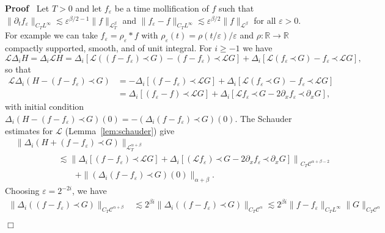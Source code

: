 \documentclass[a4paper,11pt]{article}
\newcommand{\upl}{+}
\newenvironment{proof}{\noindent\textbf{Proof\ }}{\hspace*{\fill}$\Box$\medskip}
\newcommand{\LL}{\mathscr{L}}
\newcommand{\CC}{\mathscr{C}}
\newcommand{\lpara}{\,\mathord{\prec}\,}
\begin{document}
\begin{proof}
  Let $T > 0$ and let $f_{\varepsilon}$ be a time mollification of $f$ such
  that $\| \partial_t f_{\varepsilon} \|_{C_T L^{\infty}} \lesssim
  \varepsilon^{\beta / 2 - 1} \| f \|_{\LL^{\beta}_T}$ and $\| f_{\varepsilon}
  - f \|_{C_T L^{\infty}} \lesssim \varepsilon^{\beta / 2} \| f
  \|_{\LL^{\beta}}$ for all $\varepsilon > 0$. For example we can take
  $f_{\varepsilon} = \rho_{\varepsilon} \ast f$ with $\rho_{\varepsilon} (t) =
  \rho (t / \varepsilon) / \varepsilon$ and $\rho : \mathbb{R} \rightarrow
  \mathbb{R}$ compactly supported, smooth, and of unit integral. For $i
  \geqslant - 1$ we have
  \[ \LL \Delta_i H = \Delta_i  \LL H = \Delta_i \left[ \LL ((f - f_{\varepsilon}) \lpara G) - (f
     - f_{\varepsilon}) \lpara \LL G \right] + \Delta_i \left[ \LL
     (f_{\varepsilon} \lpara G) - f_{\varepsilon} \lpara \LL G \right], \]
  so that
  \begin{align*}
      \LL \Delta_i (H - (f - f_{\varepsilon}) \lpara G) & = - \Delta_i \left[ (f - f_{\varepsilon}) \lpara \LL G \right] + \Delta_i \left[ \LL(f_{\varepsilon} \lpara G) - f_{\varepsilon} \lpara \LL G \right] \\
      & = \Delta_i \left[ (f_{\varepsilon} - f) \lpara \LL G \right] + \Delta_i \left[ \LL f_{\varepsilon} \lpara G - 2 \partial_x f_{\varepsilon} \lpara \partial_x G \right],
  \end{align*}
  with initial condition $\Delta_i (H - (f - f_{\varepsilon}) \lpara G) (0) = -
  (\Delta_i (f - f_{\varepsilon}) \lpara G) (0)$. The Schauder estimates for
  $\LL$ (Lemma~\ref{lem:schauder}) give
  \begin{align*}
      &\| \Delta_i (H + (f - f_{\varepsilon}) \lpara G) \|_{\LL^{\alpha \upl \beta}_T} \\
      &\hspace{60pt} \lesssim \left\| \Delta_i \left[ (f - f_{\varepsilon}) \lpara \LL G \right] + \Delta_i \left[ \left( \LL f_{\varepsilon} \right) \lpara G - 2 \partial_x f_{\varepsilon} \lpara \partial_x G \right] \right\|_{C_T \CC^{\alpha + \beta - 2}} \\
      &\hspace{60pt} \qquad + \| (\Delta_i (f - f_{\varepsilon}) \lpara G) (0) \|_{\alpha + \beta} .
  \end{align*}
  Choosing $\varepsilon = 2^{- 2 i}$, we have
  \begin{align*}
     \| \Delta_i ((f - f_{\varepsilon}) \lpara G) \|_{C_T \CC^{\alpha + \beta}} & \lesssim 2^{\beta i} \| \Delta_i ((f - f_{\varepsilon}) \lpara G) \|_{C_T \CC^{\alpha}} \lesssim 2^{\beta i} \| f - f_{\varepsilon} \|_{C_T L^{\infty}} \| G \|_{C_T \CC^{\alpha}} \\

\end{align*}
\end{proof}
\end{document}
